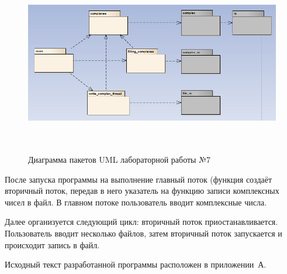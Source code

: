 \begin{figure}[htbp]
  \centering
  \includegraphics[width=150mm,height=80mm]{img/uml}
  \caption{Диаграмма пакетов UML лабораторной работы №7}\label{fig:uml}
\end{figure}

После запуска программы на выполнение главный поток (функция создаёт вторичный поток, передав в него указатель на функцию записи комплексных чисел в файл. В главном потоке пользователь вводит комплексные числа.

Далее организуется следующий цикл: вторичный поток приостанавливается. Пользователь вводит несколько файлов, затем вторичный поток запускается и происходит запись в файл.

Исходный текст разработанной программы расположен в приложении~А.

\newpage
